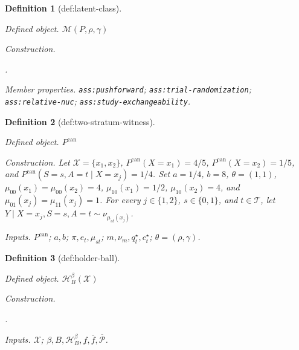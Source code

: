 \documentclass{article}
\newtheorem{definition}{Definition}
\begin{document}
\begin{definition}[def:latent-class]\label{def:latent-class}
\par\smallskip\noindent\emph{Defined object.} \(\mathcal M(P,\rho,\gamma)\)
\par\smallskip\noindent\emph{Construction.} \par\noindent {}\par\noindent.
\par\smallskip\noindent\emph{Member properties.} \texttt{ass:\allowbreak{}pushforward}; \texttt{ass:\allowbreak{}trial-\allowbreak{}randomization}; \texttt{ass:\allowbreak{}relative-\allowbreak{}nuc}; \texttt{ass:\allowbreak{}study-\allowbreak{}exchangeability}.
\end{definition}

\begin{definition}[def:two-stratum-witness]\label{def:two-stratum-witness}
\par\smallskip\noindent\emph{Defined object.} \(P^{\mathrm{can}}\)
\par\smallskip\noindent\emph{Construction.} Let \(\mathcal X=\{x_1,x_2\}\), \(P^{\mathrm{can}}(X=x_1)=4/5\), \(P^{\mathrm{can}}(X=x_2)=1/5\), and \(P^{\mathrm{can}}(S=s,A=t\mid X=x_j)=1/4\). Set \(a=1/4\), \(b=8\), \(\theta=(1,1)\), \(\mu_{00}(x_1)=\mu_{00}(x_2)=4\), \(\mu_{10}(x_1)=1/2\), \(\mu_{10}(x_2)=4\), and \(\mu_{01}(x_j)=\mu_{11}(x_j)=1\). For every \(j\in\{1,2\}\), \(s\in\{0,1\}\), and \(t\in\mathcal T\), let \(Y\mid X=x_j,S=s,A=t\sim\nu_{\mu_{st}(x_j)}\).
\par\smallskip\noindent\emph{Inputs.} \(P^{\mathrm{can}}\); \(a,b\); \(\pi,e_t,\mu_{st}\); \(m,\nu_m,q_t^\star,c_t^\star\); \(\theta=(\rho,\gamma)\).
\end{definition}

\begin{definition}[def:holder-ball]\label{def:holder-ball}
\par\smallskip\noindent\emph{Defined object.} \(\mathcal H_B^\beta(\mathcal X)\)
\par\smallskip\noindent\emph{Construction.} \par\noindent {}\par\noindent.
\par\smallskip\noindent\emph{Inputs.} \(\mathcal X\); \(\beta,B,\mathcal H_B^\beta,\underline f,\bar f,\overline{\mathcal P}\).
\end{definition}
\end{document}
